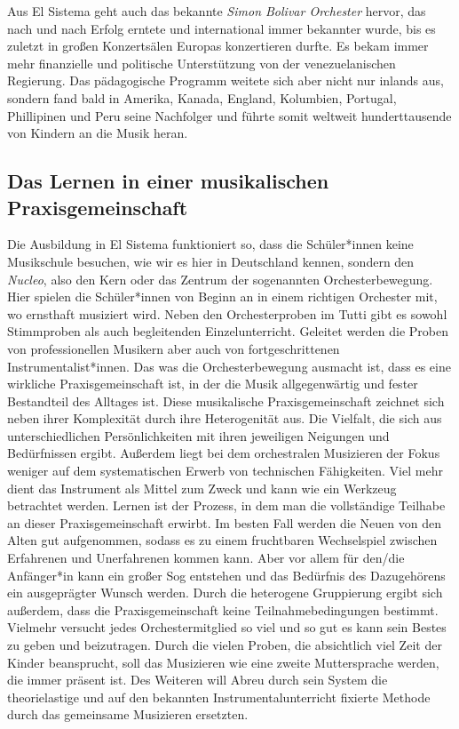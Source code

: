 Aus El Sistema geht auch das bekannte \emph{Simon Bolivar Orchester} hervor, das
nach und nach Erfolg erntete und international immer bekannter wurde, bis es
zuletzt in großen Konzertsälen Europas konzertieren durfte. Es bekam immer mehr
finanzielle und politische Unterstützung von der venezuelanischen Regierung. Das
pädagogische Programm weitete sich aber nicht nur inlands aus, sondern fand bald
in Amerika, Kanada, England, Kolumbien, Portugal, Phillipinen und Peru seine
Nachfolger und führte somit weltweit hunderttausende von Kindern an die Musik
heran. 

\subsection{Das Lernen in einer musikalischen Praxisgemeinschaft}
Die Ausbildung in El Sistema funktioniert so, dass die Schüler*innen keine
Musikschule besuchen, wie wir es hier in Deutschland kennen, sondern den
\emph{Nucleo}, also den Kern oder das Zentrum der sogenannten Orchesterbewegung.
Hier spielen die Schüler*innen von Beginn an in einem richtigen Orchester mit,
wo ernsthaft musiziert wird. Neben den Orchesterproben im Tutti gibt es sowohl
Stimmproben als auch begleitenden Einzelunterricht. Geleitet werden die Proben
von professionellen Musikern aber auch von fortgeschrittenen
Instrumentalist*innen.
\autocite[45]{kaufmann:el_sistema} 
Das was die Orchesterbewegung ausmacht ist, dass es eine wirkliche
Praxisgemeinschaft ist, in der die Musik allgegenwärtig und fester Bestandteil
des Alltages ist. Diese musikalische Praxisgemeinschaft zeichnet sich neben
ihrer Komplexität durch ihre Heterogenität aus. Die Vielfalt, die sich aus
unterschiedlichen Persönlichkeiten mit ihren jeweiligen Neigungen und
Bedürfnissen ergibt. \autocite[161]{roebke_mantilla:vom_wilden_lernen} Außerdem
liegt bei dem orchestralen Musizieren der Fokus weniger auf dem systematischen
Erwerb von technischen Fähigkeiten. Viel mehr dient das Instrument als Mittel
zum Zweck und kann wie ein Werkzeug betrachtet werden. Lernen ist der Prozess,
in dem man die vollständige Teilhabe an dieser Praxisgemeinschaft erwirbt. Im
besten Fall werden die Neuen von den Alten gut aufgenommen, sodass es zu einem
fruchtbaren Wechselspiel zwischen Erfahrenen und Unerfahrenen kommen kann. Aber
vor allem für den/die Anfänger*in kann ein großer Sog entstehen und das
Bedürfnis des Dazugehörens ein ausgeprägter Wunsch werden. Durch die heterogene
Gruppierung ergibt sich außerdem, dass die Praxisgemeinschaft keine
Teilnahmebedingungen bestimmt. Vielmehr versucht jedes Orchestermitglied so viel
und so gut es kann sein Bestes zu geben und beizutragen. Durch die vielen
Proben, die absichtlich viel Zeit der Kinder beansprucht, soll das Musizieren
wie eine zweite Muttersprache werden, die immer präsent ist.
\autocite[162]{kaufmann:el_sistema} Des Weiteren will Abreu durch sein System
die theorielastige und auf den bekannten Instrumentalunterricht fixierte Methode
durch das gemeinsame Musizieren ersetzten. 
\autocite[45]{kaufmann:el_sistema}




